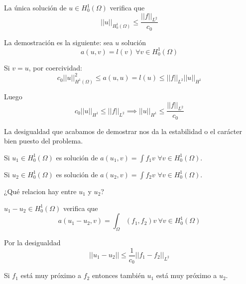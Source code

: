 	La única solución de $u\in H_0^1(\Omega)$ verifica que 
	$$||u||_{H_0^1(\Omega)} \le \frac{||f||_{L^2}}{c_0}$$
	
	La demostración es la siguiente: sea $u$ solución
	$$a(u,v) = l(v) \ \forall v\in H_0^1(\Omega)$$
	
	Si $v=u$, por coercividad:	
	$$c_0||u||^2_{H^1(\Omega)} \le a(u,u) = l(u) \le ||f||_{L^2}||u||_{H^1}$$
	
	Luego
	$$c_0||u||_{H^1}\le ||f||_{L^2} \implies ||u||_{H^1}\le \frac{||f||_{L^2}}{c_0}$$
	
	La desigualdad que acabamos de demostrar nos da la estabilidad o el carácter bien puesto del problema.
	
	Si $u_1\in H_0^1(\Omega)$ es solución de $a(u_1,v) = \int f_1 v$ $\forall v\in H_0^1(\Omega)$.
	
	Si $u_2\in H_0^1(\Omega)$ es solución de $a(u_2,v) = \int f_2 v$ $\forall v\in H_0^1(\Omega)$.
	
	¿Qué relacion hay entre $u_1$ y $u_2$?
	
	$u_1-u_2\in H_0^1(\Omega)$ verifica que 
	$$a(u_1-u_2, v) = \int_\Omega (f_1,f_2)v \ \forall v\in H_0^1 (\Omega)$$
	
	Por la desigualdad
	$$||u_1-u_2||\le \frac{1}{c_0}||f_1-f_2||_{L^2}$$
	
	Si $f_1$ está muy próximo a $f_2$ entonces también $u_1$ está muy próximo a $u_2$.
	
